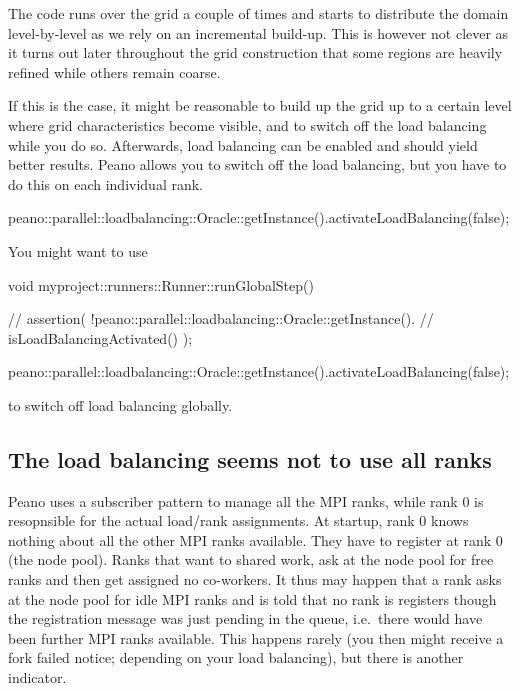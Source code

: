 \begin{smell}
The code runs over the grid a couple of times and starts to distribute the
domain level-by-level as we rely on an incremental build-up. This is however not
clever as it turns out later throughout the grid construction that some regions
are heavily refined while others remain coarse.
\end{smell}


\noindent
If this is the case, it might be reasonable to build up the grid up to a certain
level where grid characteristics become visible, and to switch off the load
balancing while you do so.
Afterwards, load balancing can be enabled and should yield better results. 
Peano allows you to switch off the load balancing, but you have to do this on
each individual rank. 

\begin{code}
peano::parallel::loadbalancing::Oracle::getInstance().activateLoadBalancing(false);
\end{code}


You might want to use
\begin{code}
void myproject::runners::Runner::runGlobalStep() {
  // assertion( !peano::parallel::loadbalancing::Oracle::getInstance().
  // isLoadBalancingActivated() );

  peano::parallel::loadbalancing::Oracle::getInstance().activateLoadBalancing(false);
}
\end{code}

\noindent
to switch off load balancing globally.



\subsection{The load balancing seems not to use all ranks}

\noindent
Peano uses a subscriber pattern to manage all the MPI ranks, while rank 0 is
resopnsible for the actual load/rank assignments.
At startup, rank 0 knows nothing about all the other MPI ranks available.
They have to register at rank 0 (the node pool).
Ranks that want to shared work, ask at the node pool for free ranks and then get
assigned no co-workers.
It thus may happen that a rank asks at the node pool for idle MPI ranks and is
told that no rank is registers though the registration message was just pending
in the queue, i.e.~there would have been further MPI ranks available.
This happens rarely (you then might receive a fork failed notice; depending on
your load balancing), but there is another indicator.

